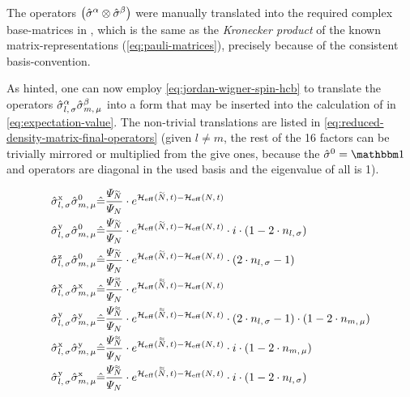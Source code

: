 The operators $\left(\pauli[]{$\alpha$}\otimes\pauli[]{$\beta$}\right)$ were manually translated into the required complex base-matrices in 
, which is the same as the \emph{Kronecker product} \cite{kroneckerProduct} of the known matrix-representations (\autoref{eq:pauli-matrices}), precisely because of the consistent basis-convention.

As hinted, one can now employ \autoref{eq:jordan-wigner-spin-hcb} to translate the operators $\pauli[l,\,\sigma]{$\alpha$}\pauli[m,\,\mu]{$\beta$}$ into a form that may be inserted into the calculation of  in \autoref{eq:expectation-value}. The non-trivial translations are listed in \autoref{eq:reduced-density-matrix-final-operators} (given $l\neq m$, the rest of the 16 factors can be trivially mirrored or multiplied from the give ones, because the $\pauli[]{0} = \one[]$ and  operators are diagonal in the used basis and the eigenvalue of all \one[] is 1).

\begin{equation}
    \label{eq:reduced-density-matrix-final-operators}
    \begin{split}
        \pauli[l,\,\sigma]{x} \pauli[m,\,\mu]{0}  &\hat{=}
        \frac{\psiN[\vphantom{N}\smash{\tilde{N}}]}{\psiN}        \cdot         e^{\HeffOft[\vphantom{N}\smash{\tilde{N}}]-\HeffOft[N]}
        \\
        \pauli[l,\,\sigma]{y} \pauli[m,\,\mu]{0}  &\hat{=}
        \frac{\psiN[\vphantom{N}\smash{\tilde{N}}]}{\psiN}        \cdot         e^{\HeffOft[\vphantom{N}\smash{\tilde{N}}]-\HeffOft[N]} \cdot i \cdot (1-2 \cdot n_{l,\,\sigma}) 
        \\
        \pauli[l,\,\sigma]{z} \pauli[m,\,\mu]{0}  &\hat{=}
        \frac{\psiN[\vphantom{N}\smash{\tilde{N}}]}{\psiN}        \cdot         e^{\HeffOft[\vphantom{N}\smash{\tilde{N}}]-\HeffOft[N]} \cdot (2 \cdot n_{l,\,\sigma} - 1) 
        \\
        \pauli[l,\,\sigma]{x} \pauli[m,\,\mu]{x}  &\hat{=}
        \frac{\psiN[\vphantom{N}\smash{\tildetilde{N}}]}{\psiN}        \cdot         e^{\HeffOft[\vphantom{N}\smash{\tildetilde{N}}]-\HeffOft[N]}
        \\
        \pauli[l,\,\sigma]{y} \pauli[m,\,\mu]{y}  &\hat{=}
        \frac{\psiN[\vphantom{N}\smash{\tildetilde{N}}]}{\psiN}        \cdot         e^{\HeffOft[\vphantom{N}\smash{\tildetilde{N}}]-\HeffOft[N]} \cdot (2 \cdot n_{l,\,\sigma} - 1) \cdot (1- 2 \cdot n_{m,\,\mu})
        \\
        \pauli[l,\,\sigma]{x} \pauli[m,\,\mu]{y}  &\hat{=}
        \frac{\psiN[\vphantom{N}\smash{\tildetilde{N}}]}{\psiN}        \cdot         e^{\HeffOft[\vphantom{N}\smash{\tildetilde{N}}]-\HeffOft[N]} \cdot i \cdot (1-2 \cdot n_{m,\,\mu}) 
        \\
        \pauli[l,\,\sigma]{y} \pauli[m,\,\mu]{x}  &\hat{=}
        \frac{\psiN[\vphantom{N}\smash{\tildetilde{N}}]}{\psiN}        \cdot         e^{\HeffOft[\vphantom{N}\smash{\tildetilde{N}}]-\HeffOft[N]} \cdot i \cdot (1-2 \cdot n_{l,\,\sigma}) 
    \end{split}
\end{equation}

